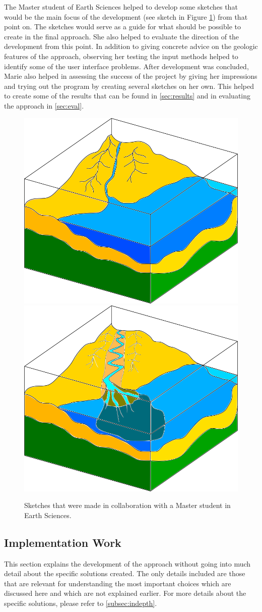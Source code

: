 \documentclass[a4paper,12pt]{report}
\newcommand{\secref}[1]{\autoref{#1}}
\begin{document}
The Master student of Earth Sciences helped to develop some sketches that would be the main focus of the development (see sketch in Figure \ref{fig:illuSketch}) from that point on. The sketches would serve as a guide for what should be possible to create in the final approach. She also helped to evaluate the direction of the development from this point. In addition to giving concrete advice on the geologic features of the approach, observing her testing the input methods helped to identify some of the user interface problems. After development was concluded, Marie also helped in assessing the success of the project by giving her impressions and trying out the program by creating several sketches on her own. This helped to create some of the results that can be found in \secref{sec:results} and in evaluating the approach in \secref{sec:eval}.

\begin{figure}
 \centering
\includegraphics[width=.4\linewidth]{thesis/illuSketch1.png}
\includegraphics[width=.4\linewidth]{thesis/illuSketch2.png}
 \caption{Sketches that were made in collaboration with a Master student in Earth Sciences.}
 \label{fig:illuSketch}
\end{figure}

\subsection{Implementation Work}

This section explains the development of the approach without going into much detail about the specific solutions created. The only details included are those that are relevant for understanding the most important choices which are discussed here and which are not explained earlier. For more details about the specific solutions, please refer to \secref{subsec:indepth}.
\end{document}

